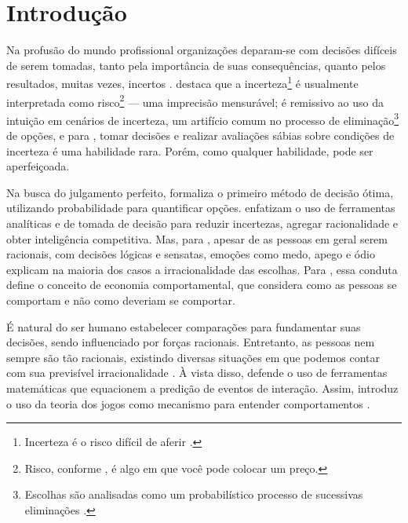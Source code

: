 \documentclass[
	article,			        %
	11pt,				          %
	oneside,			        %
	a4paper,			        %
	english,			        %
	brazil,				        %
	sumario=tradicional
]{abntex2}\usepackage[]{graphicx}\usepackage[]{color}
\begin{document}

\textual

\section*{Introdução}

Na profusão do mundo profissional organizações deparam-se com decisões difíceis de serem tomadas, tanto pela importância de suas consequências, quanto pelos resultados, muitas vezes, incertos \cite{Bekman.2009}.  destaca que a incerteza\footnote{Incerteza é o risco difícil de aferir \cite{Nate.2012}.} é usualmente interpretada como risco\footnote{Risco, conforme , é algo em que você pode colocar um preço.} --- uma imprecisão mensurável;  é remissivo ao uso da intuição em cenários de incerteza, um artifício comum no processo de eliminação\footnote{Escolhas são analisadas como um probabilístico processo de sucessivas eliminações \cite{Tversky.1972}.} de opções, e para , tomar decisões e realizar avaliações sábias sobre condições de incerteza é uma habilidade rara. Porém, como qualquer habilidade, pode ser aperfeiçoada.

Na busca do julgamento perfeito,  formaliza o primeiro método de decisão ótima, utilizando probabilidade para quantificar opções.  enfatizam o uso de ferramentas analíticas e de tomada de decisão para reduzir incertezas, agregar racionalidade e obter inteligência competitiva. Mas, para , apesar de as pessoas em geral serem racionais, com decisões lógicas e sensatas, emoções como medo, apego e ódio explicam na maioria dos casos a irracionalidade das escolhas. Para , essa conduta define o conceito de economia comportamental, que considera como as pessoas se comportam e não como deveriam se comportar. 

É natural do ser humano estabelecer comparações para fundamentar suas decisões, sendo influenciado por forças racionais. Entretanto, as pessoas nem sempre são tão racionais, existindo diversas situações em que podemos contar com sua previsível irracionalidade \cite{Ariely.2012}. À vista disso,  defende o uso de ferramentas matemáticas que equacionem a predição de eventos de interação. Assim, introduz o uso da teoria dos jogos como mecanismo para entender comportamentos \cite[min.~2:17--2:37]{MesquitaTED.2009}.
\end{document}
